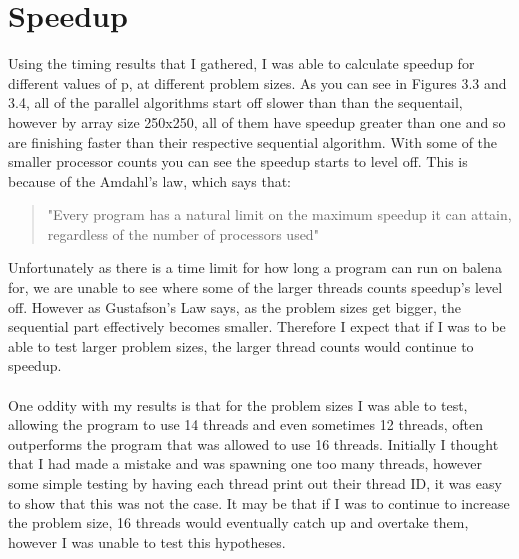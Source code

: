 \documentclass{report}
\begin{document}
\section{Speedup}
Using the timing results that I gathered, I was able to calculate speedup for different values of p, at different problem sizes. As you can see in Figures 3.3 and 3.4, all of the parallel algorithms start off slower than than the sequentail, however by array size 250x250, all of them have speedup greater than one and so are finishing faster than their respective sequential algorithm. With some of the smaller processor counts you can see the speedup starts to level off. This is because of the Amdahl's law, which says that:
\begin{quote}
"Every program has a natural limit on the maximum speedup it can attain, regardless of the number of processors used"
\end{quote}
Unfortunately as there is a time limit for how long a program can run on balena for, we are unable to see where some of the larger threads counts speedup's level off. However as Gustafson's Law says, as the problem sizes get bigger, the sequential part effectively becomes smaller. Therefore I expect that if I was to be able to test larger problem sizes, the larger thread counts would continue to speedup.
\\\\
One oddity with my results is that for the problem sizes I was able to test, allowing the program to use 14 threads and even sometimes 12 threads, often outperforms the program that was allowed to use 16 threads. Initially I thought that I had made a mistake and was spawning one too many threads, however some simple testing by having each thread print out their thread ID, it was easy to show that this was not the case. It may be that if I was to continue to increase the problem size, 16 threads would eventually catch up and overtake them, however I was unable to test this hypotheses. 
\\\\
\end{document}

